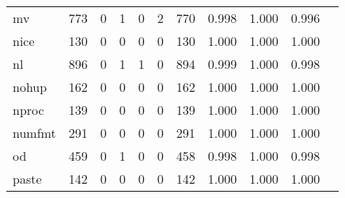 \begin{longtable}{lp{1.10cm}p{1.10cm}p{1.10cm}p{1.10cm}p{1.10cm}p{1.10cm}p{1.10cm}p{1.10cm}p{1.10cm}p{1.10cm}}
mv        &                    773 &                                  0 &                                 1 &                                0 &                                 2 &                             770 &                             0.998 &                                 1.000 &                               0.996 \\
nice      &                    130 &                                  0 &                                 0 &                                0 &                                 0 &                             130 &                             1.000 &                                 1.000 &                               1.000 \\
nl        &                    896 &                                  0 &                                 1 &                                1 &                                 0 &                             894 &                             0.999 &                                 1.000 &                               0.998 \\
nohup     &                    162 &                                  0 &                                 0 &                                0 &                                 0 &                             162 &                             1.000 &                                 1.000 &                               1.000 \\
nproc     &                    139 &                                  0 &                                 0 &                                0 &                                 0 &                             139 &                             1.000 &                                 1.000 &                               1.000 \\
numfmt    &                    291 &                                  0 &                                 0 &                                0 &                                 0 &                             291 &                             1.000 &                                 1.000 &                               1.000 \\
od        &                    459 &                                  0 &                                 1 &                                0 &                                 0 &                             458 &                             0.998 &                                 1.000 &                               0.998 \\
paste     &                    142 &                                  0 &                                 0 &                                0 &                                 0 &                             142 &                             1.000 &                                 1.000 &                               1.000 \\

\end{longtable}
